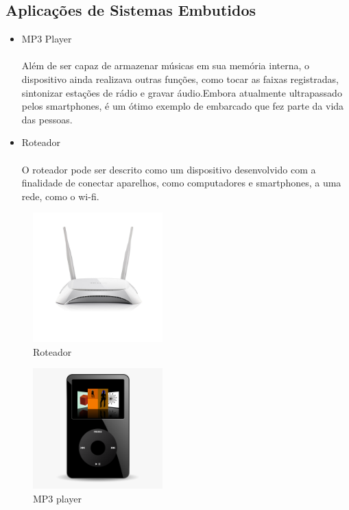 \documentclass[article]{abntex2}
\begin{document}
\subsection{Aplicações de Sistemas Embutidos}
\begin{itemize}
    \item MP3 Player
    
        \paragraph {}
        Além de ser capaz de armazenar músicas em sua memória interna, o dispositivo ainda realizava outras funções, como tocar as faixas registradas, sintonizar estações de rádio e gravar áudio.Embora atualmente ultrapassado pelos smartphones, é um ótimo exemplo de embarcado que fez parte da vida das pessoas.
        
    \item Roteador
    
        \paragraph {}
        O roteador pode ser descrito como um dispositivo desenvolvido com a finalidade de conectar aparelhos, como computadores e smartphones, a uma rede, como o wi-fi.

 \end{itemize}
 
\begin{figure}[h]
\caption{Roteador}
\label{figura:abba1}
\centering
\includegraphics[width=5cm]{master_roteador-wireless-tp-link-300n-3g-4g-2-antenas-tl-mr3420-1507399d.jpg}
\end{figure}


\begin{figure}[h]
\caption{MP3 player}
\label{figura:abba2}
\centering
\includegraphics[width=5cm]{504-5040308_mp3-player-png-transparent-png.png}
\end{figure}
\end{document}
